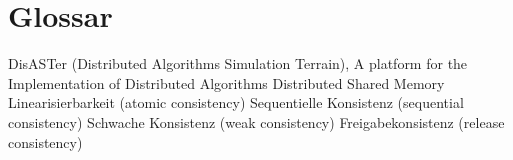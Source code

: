 \chapter{Glossar}

		{DisASTer (Distributed Algorithms Simulation Terrain), A platform for the Implementation of Distributed Algorithms}
			{Distributed Shared Memory}
			{Linearisierbarkeit (atomic consistency)}
			{Sequentielle Konsistenz (sequential consistency)}
			{Schwache Konsistenz (weak consistency)}
			{Freigabekonsistenz (release consistency)}